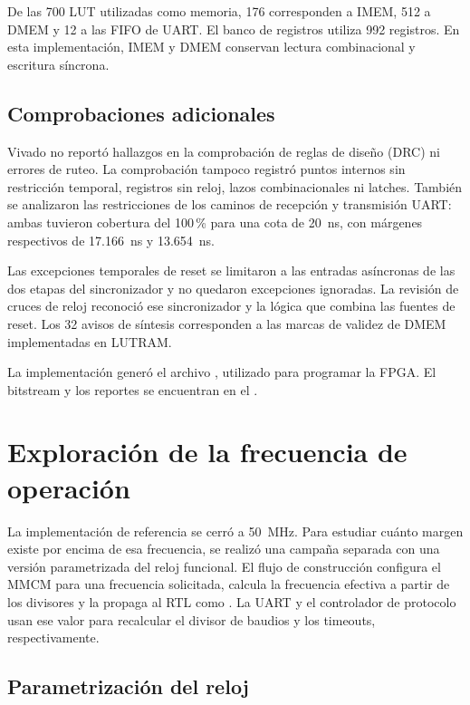 De las 700 LUT utilizadas como memoria, 176 corresponden a IMEM, 512 a DMEM y
12 a las FIFO de UART. El banco de registros utiliza 992 registros. En esta
implementación, IMEM y DMEM conservan lectura combinacional y escritura
síncrona.

\subsection{Comprobaciones adicionales}

Vivado no reportó hallazgos en la comprobación de reglas de diseño (DRC) ni
errores de ruteo. La comprobación  tampoco registró puntos
internos sin restricción temporal, registros sin reloj, lazos combinacionales
ni latches. También se analizaron las restricciones de los caminos de
recepción y transmisión UART: ambas tuvieron cobertura del 100\,\% para una
cota de \SI{20}{\nano\second}, con márgenes respectivos de
\SI[explicit-sign=+]{17.166}{\nano\second} y
\SI[explicit-sign=+]{13.654}{\nano\second}.

Las excepciones temporales de reset se limitaron a las entradas asíncronas de
las dos etapas del sincronizador y no quedaron excepciones ignoradas. La
revisión de cruces de reloj reconoció ese sincronizador y la lógica que combina
las fuentes de reset. Los 32 avisos de síntesis corresponden a las marcas de
validez de DMEM implementadas en LUTRAM.

La implementación generó el archivo , utilizado para
programar la FPGA. El bitstream y los reportes se encuentran en el
.

\section{Exploración de la frecuencia de operación}\label{sec:frecuencia-operacion}

La implementación de referencia se cerró a \SI{50}{\mega\hertz}. Para estudiar
cuánto margen existe por encima de esa frecuencia, se realizó una campaña
separada con una versión parametrizada del reloj funcional. El flujo de
construcción configura el MMCM para una frecuencia solicitada, calcula la
frecuencia efectiva a partir de los divisores y la propaga al RTL como
. La UART y el controlador de protocolo usan ese valor para
recalcular el divisor de baudios y los timeouts, respectivamente.

\subsection{Parametrización del reloj}

